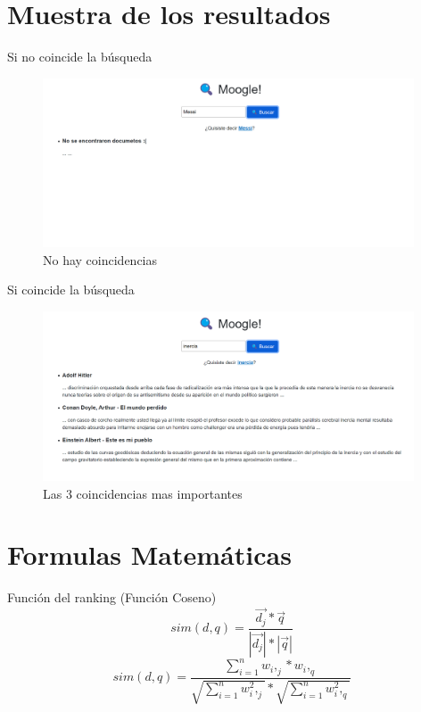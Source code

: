 \documentclass{beamer}
\begin{document}
  \section{Muestra de los resultados}
  \begin{frame}{Si no coincide la búsqueda} 
    \begin{figure}[h]
      \center
      \includegraphics[width=11cm]{Ningun resultado.png}
      \caption{No hay coincidencias}
      \label{}
    \end{figure}
    
  \end{frame}
  \begin{frame}{Si coincide la búsqueda} 
    \begin{figure}[h]
      \center
      \includegraphics[width=11cm]{3 resultados.png}
      \caption{Las 3 coincidencias mas importantes}
      \label{}
    \end{figure}
    
  \end{frame}

  
  
  
  \section{Formulas Matemáticas}
  \begin{frame}{Función del ranking (Función Coseno)}
    \begin{equation}
        sim(d,q) = \frac{\vec{d_j}*\vec{q}}{{|\vec{d_j}|*|\vec{q}|}}
    \end{equation}
    \begin{equation}
        sim(d,q) = \frac{\sum_{i=1}^{n}w_i,_j*w_i,_q}{\sqrt{\sum_{i=1}^{n}w^2_i,_j}*\sqrt{\sum_{i=1}^{n}w^2_i,_q}}
       \end{equation}
\end{frame} 
\end{document}

